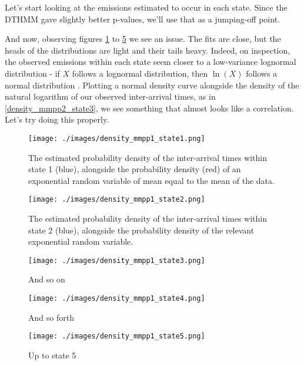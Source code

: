 Let's start looking at the emissions estimated to occur in each state. Since the DTHMM gave slightly better p-values, we'll use that as a jumping-off point.

And now, observing figures \ref{density_mmpp1_state1} to \ref{density_mmpp1_state5} we see an issue. The fits are close, but the heads of the distributions are light and their tails heavy. Indeed, on inspection, the observed emissions within each state seem closer to a low-variance lognormal distribution - if $X$ follows a lognormal distribution, then $\ln(X)$ follows a normal distribution \cite{mwlognormal}. Plotting a normal density curve alongside the density of the natural logarithm of our observed inter-arrival times, as in \ref{density_mmpp2_state3}, we see something that almost looks like a correlation. Let's try doing this properly.

\clearpage

\begin{figure}[h!]
\texttt{[image: ./images/density\_mmpp1\_state1.png]}
\caption{The estimated probability density of the inter-arrival times within state 1 (blue), alongside the probability density (red) of an exponential random variable of mean equal to the mean of the data.}
\label{density_mmpp1_state1}
\end{figure}

\begin{figure}[h!]
\texttt{[image: ./images/density\_mmpp1\_state2.png]}
\caption{The estimated probability density of the inter-arrival times within state 2 (blue), alongside the probability density of the relevant exponential random variable.}
\label{density_mmpp1_state2}
\end{figure}

\begin{figure}[h!]
\texttt{[image: ./images/density\_mmpp1\_state3.png]}
\caption{And so on}
\label{density_mmpp1_state3}
\end{figure}

\begin{figure}[h!]
\texttt{[image: ./images/density\_mmpp1\_state4.png]}
\caption{And so forth}
\label{density_mmpp1_state4}
\end{figure}

\begin{figure}[h!]
\texttt{[image: ./images/density\_mmpp1\_state5.png]}
\caption{Up to state 5}
\label{density_mmpp1_state5}
\end{figure}

